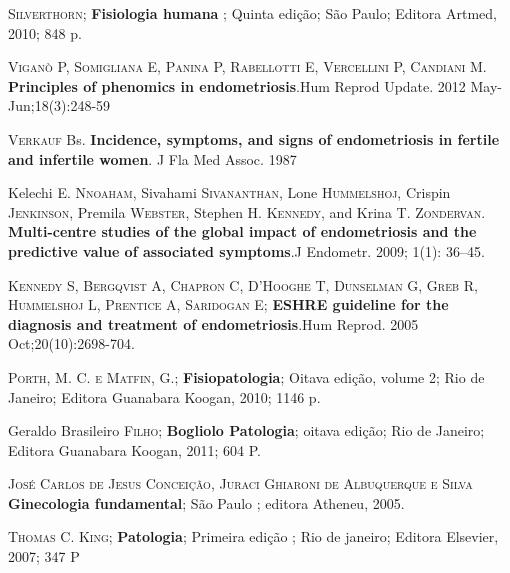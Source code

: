 \documentclass[12pt]{article} %
\begin{document}
\textsc{Silverthorn};\textbf{ Fisiologia humana} ; Quinta edição; São Paulo; Editora Artmed, 2010; 848 p.

\vspace{0,5cm}

\textsc{Viganò P, Somigliana E, Panina P, Rabellotti E, Vercellini P, Candiani M}. \textbf{Principles of phenomics in endometriosis}.Hum Reprod Update. 2012 May-Jun;18(3):248-59

\vspace{0,5cm}

\textsc{Verkauf} Bs. \textbf{ Incidence, symptoms, and signs of endometriosis in fertile and infertile women}. J Fla Med Assoc. 1987

\vspace{0,5cm}

Kelechi E.\textsc{ Nnoaham}, Sivahami \textsc{Sivananthan}, Lone \textsc{Hummelshoj}, Crispin \textsc{Jenkinson}, Premila\textsc{ Webster}, Stephen H. \textsc{Kennedy}, and Krina T. \textsc{Zondervan}.\textbf{ Multi-centre studies of the global impact of endometriosis and the predictive value of associated symptoms}.J Endometr. 2009; 1(1): 36–45. 

\vspace{0,5cm}

\textsc{Kennedy S, Bergqvist A, Chapron C, D'Hooghe T, Dunselman G, Greb R, Hummelshoj L, Prentice A, Saridogan E}; \textbf{ESHRE guideline for the diagnosis and treatment of endometriosis}.Hum Reprod. 2005 Oct;20(10):2698-704. 

\vspace{0,5cm}

\textsc{Porth, M. C. e Matfin, G}.;\textbf{ Fisiopatologia}; Oitava edição, volume 2; Rio de
Janeiro; Editora Guanabara Koogan, 2010; 1146 p.

\vspace{0,5cm}

Geraldo Brasileiro\textsc{ Filho}; \textbf{Bogliolo Patologia}; oitava edição; Rio de Janeiro; Editora Guanabara Koogan, 2011; 604 P.

\vspace{0,5cm}

\textsc{José Carlos de Jesus Conceição, Juraci Ghiaroni de Albuquerque e Silva} \textbf{Ginecologia fundamental}; São Paulo ; editora  Atheneu, 2005.

\vspace{0,5cm}
	

\textsc{Thomas C. King};\textbf{ Patologia}; Primeira edição ; Rio de
janeiro; Editora Elsevier, 2007; 347 P
\end{document}

